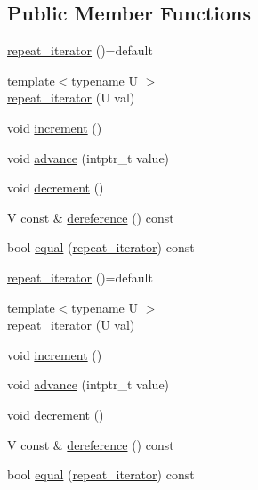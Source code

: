\subsection*{Public Member Functions}
\begin{DoxyCompactItemize}
\item 
\mbox{\hyperlink{structrah_1_1view_1_1repeat__iterator_a627f63a3a1ecf8a5dbcc88fb47d4a494}{repeat\+\_\+iterator}} ()=default
\item 
{\footnotesize template$<$typename U $>$ }\\\mbox{\hyperlink{structrah_1_1view_1_1repeat__iterator_af91bc578d1fe7d90373896abc8e56546}{repeat\+\_\+iterator}} (U val)
\item 
void \mbox{\hyperlink{structrah_1_1view_1_1repeat__iterator_a5556f69de4c759f4fec42c12d70ea869}{increment}} ()
\item 
void \mbox{\hyperlink{structrah_1_1view_1_1repeat__iterator_ae4376a0f9f5c50828941a7df853cc5cb}{advance}} (intptr\+\_\+t value)
\item 
void \mbox{\hyperlink{structrah_1_1view_1_1repeat__iterator_ae3ed58503233856a54f9dfcf662edaf6}{decrement}} ()
\item 
V const  \& \mbox{\hyperlink{structrah_1_1view_1_1repeat__iterator_a0b1fbfa1670a227d4d129dcdb9a549e8}{dereference}} () const
\item 
bool \mbox{\hyperlink{structrah_1_1view_1_1repeat__iterator_ab42103684163bf38275999ff908d3113}{equal}} (\mbox{\hyperlink{structrah_1_1view_1_1repeat__iterator}{repeat\+\_\+iterator}}) const
\item 
\mbox{\hyperlink{structrah_1_1view_1_1repeat__iterator_a627f63a3a1ecf8a5dbcc88fb47d4a494}{repeat\+\_\+iterator}} ()=default
\item 
{\footnotesize template$<$typename U $>$ }\\\mbox{\hyperlink{structrah_1_1view_1_1repeat__iterator_af91bc578d1fe7d90373896abc8e56546}{repeat\+\_\+iterator}} (U val)
\item 
void \mbox{\hyperlink{structrah_1_1view_1_1repeat__iterator_a5556f69de4c759f4fec42c12d70ea869}{increment}} ()
\item 
void \mbox{\hyperlink{structrah_1_1view_1_1repeat__iterator_ae4376a0f9f5c50828941a7df853cc5cb}{advance}} (intptr\+\_\+t value)
\item 
void \mbox{\hyperlink{structrah_1_1view_1_1repeat__iterator_ae3ed58503233856a54f9dfcf662edaf6}{decrement}} ()
\item 
V const  \& \mbox{\hyperlink{structrah_1_1view_1_1repeat__iterator_a0b1fbfa1670a227d4d129dcdb9a549e8}{dereference}} () const
\item 
bool \mbox{\hyperlink{structrah_1_1view_1_1repeat__iterator_ab42103684163bf38275999ff908d3113}{equal}} (\mbox{\hyperlink{structrah_1_1view_1_1repeat__iterator}{repeat\+\_\+iterator}}) const
\end{DoxyCompactItemize}
